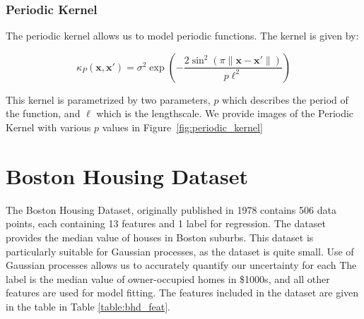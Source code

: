 \documentclass{article}
\newcommand{\bx}{\boldsymbol{x}}
\begin{document}
\subsubsection{Periodic Kernel}

The periodic kernel allows us to model periodic functions. The kernel is given by:

\[
  \kappa_{P}(\bx, \bx') = \sigma^{2}  \exp(- \frac{2 \sin^{2}(\pi \|\bx - \bx'\|)}{p \ell^{2}})
\]

This kernel is parametrized by two parameters, $p$ which describes the period of the function, and $\ell$ which is the
lengthscale\cite{duvenaud_automatic_2014}. We provide images of the Periodic Kernel with various $p$ values in
Figure~\ref{fig:periodic_kernel}


\section{Boston Housing Dataset}

The Boston Housing Dataset, originally published in 1978 contains 506 data points, each containing 13 features and 1
label for regression\cite{harrison_hedonic_1978}. The dataset provides the median value of houses in Boston suburbs.
This dataset is particularly suitable for Gaussian processes, as the dataset is quite small. Use of Gaussian processes
allows us to accurately quantify our uncertainty for each The label is the median value of owner-occupied homes in \$1000s, and
all other features are used for model fitting. The features included in the dataset are given in the table in Table
\ref{table:bhd_feat}.
\end{document}
